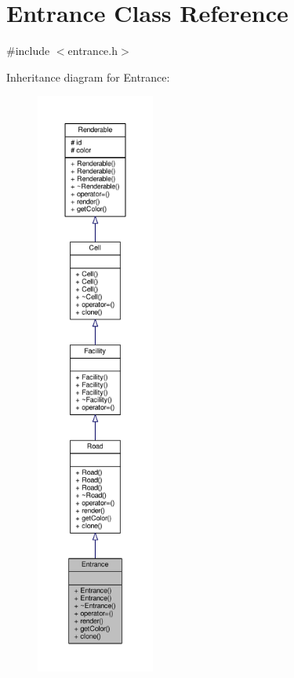 \hypertarget{classEntrance}{}\section{Entrance Class Reference}
\label{classEntrance}


{\ttfamily \#include $<$entrance.\+h$>$}



Inheritance diagram for Entrance\+:
\nopagebreak
\begin{figure}[H]
\begin{center}
\leavevmode
\includegraphics[height=550pt]{classEntrance__inherit__graph}
\end{center}
\end{figure}


